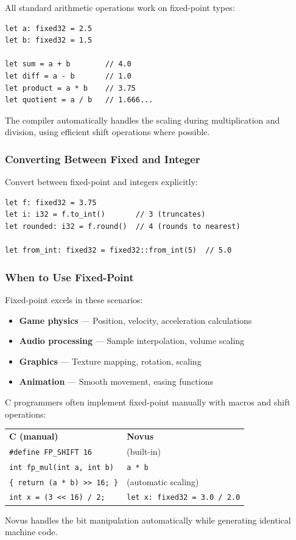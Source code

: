 All standard arithmetic operations work on fixed-point types:

\begin{lstlisting}
let a: fixed32 = 2.5
let b: fixed32 = 1.5

let sum = a + b        // 4.0
let diff = a - b       // 1.0
let product = a * b    // 3.75
let quotient = a / b   // 1.666...
\end{lstlisting}

The compiler automatically handles the scaling during multiplication and division, using efficient shift operations where possible.

\subsubsection{Converting Between Fixed and Integer}

Convert between fixed-point and integers explicitly:

\begin{lstlisting}
let f: fixed32 = 3.75
let i: i32 = f.to_int()       // 3 (truncates)
let rounded: i32 = f.round()  // 4 (rounds to nearest)

let from_int: fixed32 = fixed32::from_int(5)  // 5.0
\end{lstlisting}

\subsubsection{When to Use Fixed-Point}

Fixed-point excels in these scenarios:

\begin{itemize}
    \item \textbf{Game physics} --- Position, velocity, acceleration calculations
    \item \textbf{Audio processing} --- Sample interpolation, volume scaling
    \item \textbf{Graphics} --- Texture mapping, rotation, scaling
    \item \textbf{Animation} --- Smooth movement, easing functions
\end{itemize}

\begin{comingfromc}
C programmers often implement fixed-point manually with macros and shift operations:

\begin{tabular}{ll}
\textbf{C (manual)} & \textbf{Novus} \\
\texttt{\#define FP\_SHIFT 16} & (built-in) \\
\texttt{int fp\_mul(int a, int b)} & \texttt{a * b} \\
\texttt{\{ return (a * b) >> 16; \}} & (automatic scaling) \\
\texttt{int x = (3 << 16) / 2;} & \texttt{let x: fixed32 = 3.0 / 2.0} \\
\end{tabular}

Novus handles the bit manipulation automatically while generating identical machine code.
\end{comingfromc}

